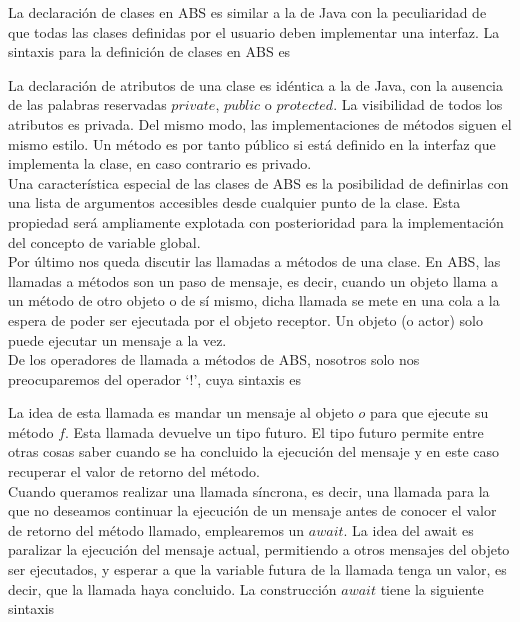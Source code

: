 La declaración de clases en ABS es similar a la de Java con la peculiaridad de que todas las clases definidas por el usuario deben implementar una interfaz. La sintaxis para la definición de clases en ABS es



La declaración de atributos de una clase es idéntica a la de Java, con la ausencia de las palabras reservadas $private$, $public$ o $protected$. La visibilidad de todos los atributos es privada. Del mismo modo, las implementaciones de métodos siguen el mismo estilo. Un método es por tanto público si está definido en la interfaz que implementa la clase, en caso contrario es privado.\\

Una característica especial de las clases de ABS es la posibilidad de definirlas con una lista de argumentos accesibles desde cualquier punto de la clase. Esta propiedad será ampliamente explotada con posterioridad para la implementación del concepto de variable global.\\

Por último nos queda discutir las llamadas a métodos de una clase. En ABS, las llamadas a métodos son un paso de mensaje, es decir, cuando un objeto llama a un método de otro objeto o de sí mismo, dicha llamada se mete en una cola a la espera de poder ser ejecutada por el objeto receptor. Un objeto (o actor) solo puede ejecutar un mensaje a la vez.\\

De los operadores de llamada a métodos de ABS, nosotros solo nos preocuparemos del operador `$!$', cuya sintaxis es



La idea de esta llamada es mandar un mensaje al objeto $o$ para que ejecute su método $f$. Esta llamada devuelve un tipo futuro. El tipo futuro permite entre otras cosas saber cuando se ha concluido la ejecución del mensaje y en este caso recuperar el valor de retorno del método.\\

Cuando queramos realizar una llamada síncrona, es decir, una llamada para la que no deseamos continuar la ejecución de un mensaje antes de conocer el valor de retorno del método llamado, emplearemos un $await$. La idea del await es paralizar la ejecución del mensaje actual, permitiendo a otros mensajes del objeto ser ejecutados, y esperar a que la variable futura de la llamada tenga un valor, es decir, que la llamada haya concluido. La construcción $await$ tiene la siguiente sintaxis

